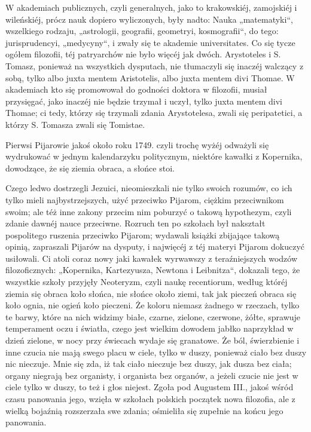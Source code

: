 \documentclass{book}
\begin{document}
W akademiach publicznych, czyli generalnych, jako to krakowskiéj, zamojskiéj i wileńskiéj, prócz nauk dopiero wyliczonych, były nadto: Nauka „matematyki“, wszelkiego rodzaju, „astrologii, geografii, geometryi, kosmografii“, do tego: jurisprudencyi, „medycyny“, i zwały się te akademie universitates. Co się tycze ogółem filozofii, téj patryarchów nie było więcéj jak dwóch. Arystoteles i S. Tomasz, ponieważ na wszystkich dysputach, nie tłumaczyli się inaczéj walczący z sobą, tylko albo juxta mentem Aristotelis, albo juxta mentem divi Thomae. W akademiach kto się promowował do godności doktora w filozofii, musiał przysięgać, jako inaczéj nie będzie trzymał i uczył, tylko juxta mentem divi Thomae; ci tedy, którzy się trzymali zdania Arystotelesa, zwali się peripatetici, a którzy S. Tomasza zwali się Tomistae.

Pierwsi Pijarowie jakoś około roku 1749. czyli trochę wyżéj odważyli się wydrukować w jednym kalendarzyku politycznym, niektóre kawałki z Kopernika, dowodzące, że się ziemia obraca, a słońce stoi.

Czego ledwo dostrzegli Jezuici, nieomieszkali nie tylko swoich rozumów, co ich tylko mieli najbystrzejszych, użyć przeciwko Pijarom, ciężkim przeciwnikom swoim; ale téż inne zakony przecim nim poburzyć o takową hypothezym, czyli zdanie dawnéj nauce przeciwne. Rozruch ten po szkołach był nakształt pospolitego ruszenia przeciwko Pijarom; wydawali książki zbijające takową opinią, zapraszali Pijarów na dysputy, i najwięcéj z téj materyi Pijarom dokuczyć usiłowali. Ci atoli coraz nowy jaki kawałek wyrwawszy z teraźniejszych wodzów filozoficznych: „Kopernika, Kartezyusza, Newtona i Leibnitza“, dokazali tego, że wszystkie szkoły przyjęły Neoteryzm, czyli naukę recentiorum, według któréj ziemia się obraca koło słońca, nie słońce około ziemi, tak jak pieczeń obraca się koło ognia, nie ogień koło pieczeni. Że koloru niemasz żadnego w rzeczach, tylko te barwy, które na nich widzimy białe, czarne, zielone, czerwone, żółte, sprawuje temperament oczu i światła, czego jest wielkim dowodem jabłko naprzykład w dzień zielone, w nocy przy świecach wydaje się granatowe. Że ból, świerzbienie i inne czucia nie mają swego placu w ciele, tylko w duszy, ponieważ ciało bez duszy nic nieczuje. Mnie się zda, iż tak ciało nieczuje bez duszy, jak dusza bez ciała; organy niegrają bez organisty, i organista bez organów, a jeżeli czucie nie jest w ciele tylko w duszy, to też i głos niejest. Zgoła pod Augustem III., jakoś wśród czasu panowania jego, wzięła w szkołach polskich początek nowa filozofia, ale z wielką bojaźnią rozszerzała swe zdania; ośmieliła się zupełnie na końcu jego panowania.
\end{document}
